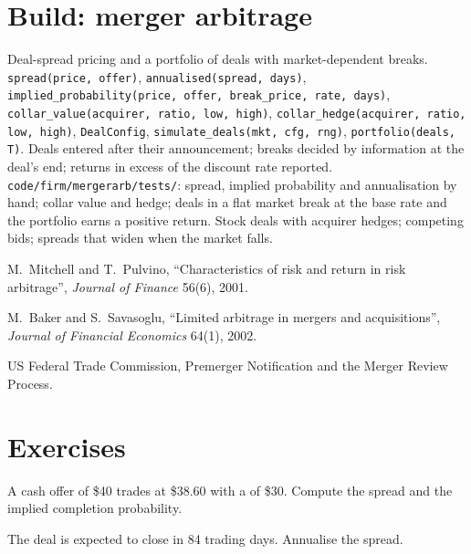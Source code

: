 \section{Build: merger arbitrage}\label{bld:s1:merger-arbitrage:mergerarb}

\begin{build}
 Deal-spread pricing and a portfolio of deals with market-dependent breaks.
 \texttt{spread(price, offer)}, \texttt{annualised(spread, days)}, \texttt{implied\_probability(price, offer, break\_price, rate, days)},
\texttt{collar\_value(acquirer, ratio, low, high)}, \texttt{collar\_hedge(acquirer, ratio, low, high)}, \texttt{DealConfig}, \texttt{simulate\_deals(mkt, cfg, rng)},
\texttt{portfolio(deals, T)}.
 Deals entered after their announcement; breaks decided by information at the deal's end; returns in excess of the discount rate reported.
 \texttt{code/firm/mergerarb/tests/}: spread, implied probability and annualisation by hand; collar value and hedge; deals in a flat
market break at the base rate and the portfolio earns a positive return.
 Stock deals with acquirer hedges; competing bids; spreads that widen when the market falls.
\end{build}

\begin{omsources}
\item M.~Mitchell and T.~Pulvino, ``Characteristics of risk and return in risk arbitrage'', \emph{Journal of Finance} 56(6), 2001.
\item M.~Baker and S.~Savasoglu, ``Limited arbitrage in mergers and acquisitions'', \emph{Journal of Financial Economics} 64(1), 2002.
\item US Federal Trade Commission, Premerger Notification and the Merger Review Process.
\end{omsources}

\section{Exercises}

\begin{exercise}[$\star$]\label{exo:s1:merger-arbitrage:1}
A cash offer of \$40 trades at \$38.60 with a  of \$30. Compute the spread and the implied completion probability.
\end{exercise}

\begin{exercise}[$\star$]\label{exo:s1:merger-arbitrage:2}
The deal is expected to close in 84 trading days. Annualise the spread.
\end{exercise}

